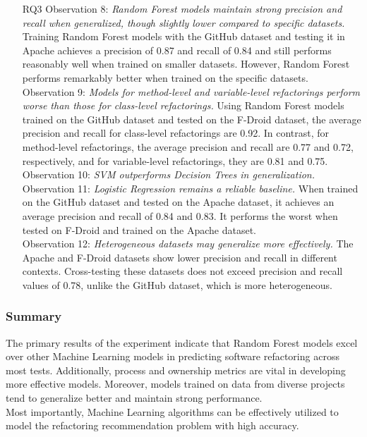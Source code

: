 \begin{itemize}
    \item[RQ3] Observation 8: \textit{Random Forest models maintain strong precision and recall when generalized, though slightly lower compared to specific datasets.} Training Random Forest models with the GitHub dataset and testing it in Apache achieves a precision of 0.87 and recall of 0.84 and still performs reasonably well when trained on smaller datasets. However, Random Forest performs remarkably better when trained on the specific datasets.\\Observation 9: \textit{Models for method-level and variable-level refactorings perform worse than those for class-level refactorings.} Using Random Forest models trained on the GitHub dataset and tested on the F-Droid dataset, the average precision and recall for class-level refactorings are 0.92. In contrast, for method-level refactorings, the average precision and recall are 0.77 and 0.72, respectively, and for variable-level refactorings, they are 0.81 and 0.75.\\ Observation 10: \textit{SVM outperforms Decision Trees in generalization.}\\ Observation 11: \textit{Logistic Regression remains a reliable baseline.} When trained on the GitHub dataset and tested on the Apache dataset, it achieves an average precision and recall of 0.84 and 0.83. It performs the worst when tested on F-Droid and trained on the Apache dataset.\\ Observation 12: \textit{Heterogeneous datasets may generalize more effectively.} The Apache and F-Droid datasets show lower precision and recall in different contexts. Cross-testing these datasets does not exceed precision and recall values of 0.78, unlike the GitHub dataset, which is more heterogeneous.
\end{itemize}
\subsubsection{Summary}
The primary results of the experiment indicate that Random Forest models excel over other Machine Learning models in predicting software refactoring across most tests. Additionally, process and ownership metrics are vital in developing more effective models. Moreover, models trained on data from diverse projects tend to generalize better and maintain strong performance.\\
Most importantly, Machine Learning algorithms can be effectively utilized to model the refactoring recommendation problem with high accuracy.

